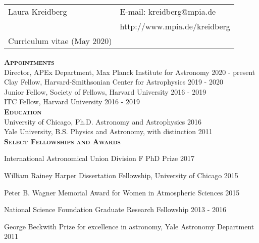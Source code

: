 \documentclass[12pt,letterpaper]{article}
\def\name{Laura Kreidberg}
\begin{document}
\sloppy




\begin{tabular}{@{}p{4.0in}@{}p{5.0in}}
    \LARGE{Laura Kreidberg}                  & E-mail: kreidberg@mpia.de\\  
    \,                                       & http://www.mpia.de/kreidberg \\ 
    \large{Curriculum vitae} (May 2020) & \, \\
\end{tabular}

\vspace{8mm}

\textbf{\textsc{Appointments}}\\
Director, APEx Department, Max Planck Institute for Astronomy \hfill 2020 - present\\
Clay Fellow, Harvard-Smithsonian Center for Astrophysics \hfill 2019 - 2020\\
Junior Fellow, Society of Fellows, Harvard University \hfill 2016 - 2019\\
ITC Fellow, Harvard University \hfill 2016 - 2019\\

\textbf{\textsc{Education}}\\
University of Chicago, Ph.D. Astronomy and Astrophysics \hfill 2016\\
Yale University, B.S. Physics and Astronomy, with distinction \hfill 2011\\

\textbf{\textsc{Select Fellowships and Awards}}
\begin{compactitem}[]
\item International Astronomical Union Division F PhD Prize \hfill 2017
\item William Rainey Harper Dissertation Fellowship, University of Chicago \hfill 2015
\item Peter B. Wagner Memorial Award for Women in Atmospheric Sciences \hfill 2015
\item National Science Foundation Graduate Research Fellowship \hfill 2013 - 2016
\item George Beckwith Prize for excellence in astronomy, Yale Astronomy Department \hfill2011
\end{compactitem}
\vspace{6mm}
\end{document}
